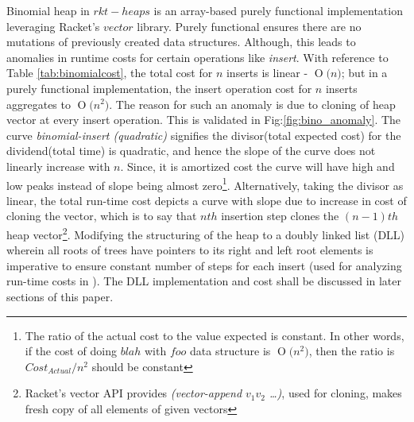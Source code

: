 \documentclass{llncs}
\newcommand{\BigO}[1]{\ensuremath{\operatorname{O}\bigl(#1\bigr)}}
\begin{document}
Binomial heap in $rkt-heaps$ is an array-based purely functional implementation leveraging Racket's $vector$ library. Purely functional ensures there are no mutations of previously created data structures. Although, this leads to anomalies in runtime costs for certain operations like \emph{insert}. With reference to Table \ref{tab:binomialcost}, the total cost for $n$ inserts is linear - \BigO{n}; but in a purely functional implementation, the insert operation cost for $n$ inserts aggregates to \BigO{n^2}. The reason for such an anomaly is due to cloning of heap vector at every insert operation. This is validated in Fig:\ref{fig:bino_anomaly}. The curve \emph{binomial-insert (quadratic)} signifies the divisor(total expected cost) for the dividend(total time) is quadratic, and hence the slope of the curve does not linearly increase with $n$. Since, it is amortized cost the curve will have high and low peaks instead of slope being almost zero\footnote{The ratio of the actual cost to the value expected is constant. In other words, if the cost of doing $blah$ with $foo$ data structure is \BigO{n^2}, then the ratio is $Cost_{Actual} / n^2$ should be constant}. Alternatively, taking the divisor as linear, the total run-time cost depicts a curve with slope due to increase in cost of cloning the vector, which is to say that $nth$ insertion step clones the $(n-1)th$ heap vector\footnote{Racket's vector API provides \emph{(vector-append $v_1 v_2$ \dots)}, used for cloning, makes fresh copy of all elements of given vectors}. Modifying the structuring of the heap to a doubly linked list (DLL) wherein all roots of trees have pointers to its right and left root elements is imperative to ensure constant number of steps for each insert (used for analyzing run-time costs in \cite{kozen1992design}). The DLL implementation and cost shall be discussed in later sections of this paper. 
\end{document}
